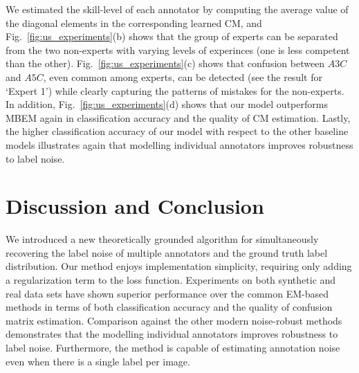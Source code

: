 We estimated the skill-level of each annotator by computing the average value of the diagonal elements in the corresponding learned CM, and Fig.~\ref{fig:us_experiments}(b) shows that the group of experts can be separated from the two non-experts with varying levels of experinces (one is less competent than the other). Fig.~\ref{fig:us_experiments}(c) shows that confusion between $A3C$ and $A5C$, even common among experts, can be detected (see the result for `Expert 1') while clearly capturing the patterns of mistakes for the non-experts. In addition, Fig.~\ref{fig:us_experiments}(d) shows that our model outperforms MBEM \cite{khetan2017learning} again in classification accuracy and the quality of CM estimation. Lastly, the higher classification accuracy of our model with respect to the other baseline models illustrates again that modelling individual annotators improves robustness to label noise. 



\section{Discussion and Conclusion}

We introduced a new theoretically grounded algorithm for simultaneously recovering the label noise of multiple annotators and the ground truth label distribution. Our method enjoys implementation simplicity, requiring only adding a regularization term to the loss function. Experiments on both synthetic and real data sets have shown superior performance over the common EM-based methods in terms of both classification accuracy and the quality of confusion matrix estimation. Comparison against the other modern noise-robust methods demonstrates that the modelling individual annotators improves robustness to label noise. Furthermore, the method is capable of estimating annotation noise even when there is a single label per image. 

